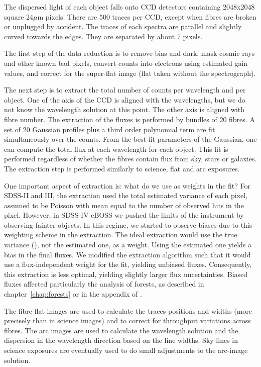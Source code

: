 The dispersed light of each object falls onto CCD detectors containing 
2048x2048 square 24$\mu$m pixels. 
There are 500 traces per CCD, except when fibres are broken or unplugged by accident. 
The traces of each spectra are parallel and slightly curved towards the edges. 
They are separated by about 7 pixels. 

The first step of the data reduction is to remove bias and dark, mask 
cosmic rays and other known bad pixels, 
convert counts into electrons using estimated gain values, 
and correct for the super-flat image (flat taken without the spectrograph). 

The next step is to extract the total number of counts per wavelength and per object.
One of the axis of the CCD is aligned with the wavelengths, but we do not know the
wavelength solution at this point. The other axis is aligned with fibre number. 
The extraction of the fluxes is performed by bundles of 20 fibres. A set of 20 Gaussian
profiles plus a third order polynomial term are fit simultaneously over the counts. 
From the best-fit parameters of the Gaussian, one can compute the total flux at each 
wavelength for each object. This fit is performed regardless of whether the fibres contain 
flux from sky, stars or galaxies. 
The extraction step is performed similarly to science, flat and arc exposures. 


One important aspect of extraction is: what do we use as weights in the fit?
For SDSS-II and III, the extraction used the total estimated variance of each pixel,
assumed to be Poisson with mean equal to the number of observed hits in the pixel. 
However, in SDSS-IV eBOSS we pushed the limits of the instrument by observing fainter
objects. In this regime, we started to observe biases due to this weighting scheme in 
the extraction. The ideal extraction would use the true variance 
(\cite{horneOptimalExtractionAlgorithm1986}), not the estimated
one, as a weight. Using the estimated one yields a bias in the final fluxes. 
We modified the extraction algorithm such that it would use a flux-independent weight 
for the fit, yielding unbiased fluxes. Consequently, this extraction is less 
optimal, yielding slightly larger flux uncertainties. Biased fluxes affected 
particularly the analysis of \lya forests, as described in chapter~\ref{chap:forests}
or in the appendix of \cite{bautistaMeasurementBaryonAcoustic2017}.

The fibre-flat images are used to calculate the traces positions and widths 
(more precisely than in science images) 
and to correct for throughput variations across fibres. 
The arc images are used to calculate the wavelength solution and 
the dispersion in the wavelength direction based on the line widths. 
Sky lines in science exposures are eventually used to do small adjustments 
to the arc-image solution. 

